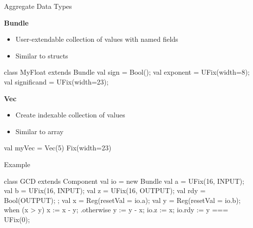 \documentclass[xcolor=pdflatex,dvipsnames,table]{beamer}
\begin{document}
\begin{frame}[fragile]{Aggregate Data Types}

\textbf{Bundle}

\begin{itemize}
\item User-extendable collection of values with named fields
\item Similar to structs
\end{itemize}

\begin{footnotesize}
\begin{scala}
class MyFloat extends Bundle{
  val sign        = Bool();
  val exponent    = UFix(width=8);
  val significand = UFix(width=23);
}
\end{scala}
\end{footnotesize}

\textbf{Vec}

\begin{itemize}
\item Create indexable collection of values
\item Similar to array
\end{itemize}

\begin{footnotesize}
\begin{scala}
val myVec = Vec(5){ Fix(width=23) }
\end{scala}
\end{footnotesize}

\end{frame}

\begin{frame}[fragile]{Example}
\begin{footnotesize}
\begin{scala}
class GCD extends Component {
  val io = new Bundle {
    val a   = UFix(16, INPUT);
    val b   = UFix(16, INPUT);
    val z   = UFix(16, OUTPUT);
    val rdy = Bool(OUTPUT); };
  val x  = Reg(resetVal = io.a);
  val y  = Reg(resetVal = io.b);
  when (x > y) {
    x := x - y;
  } .otherwise {
    y := y - x;
  }
  io.z   := x;
  io.rdy := y === UFix(0);
}
\end{scala}
\end{footnotesize}
\end{frame}
\end{document}
